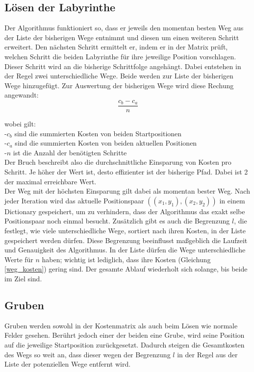 \documentclass[a4paper,10pt,ngerman]{scrartcl}
\begin{document}
\subsection{Lösen der Labyrinthe}
Der Algorithmus funktioniert so, dass er jeweils den momentan besten Weg aus der Liste der bisherigen Wege entnimmt und diesen um einen weiteren Schritt erweitert.
Den nächsten Schritt ermittelt er, indem er in der Matrix prüft, welchen Schritt die beiden Labyrinthe für ihre jeweilige Position vorschlagen.
Dieser Schritt wird an die bisherige Schrittfolge angehängt.
Dabei entstehen in der Regel zwei unterschiedliche Wege. Beide werden zur Liste der bisherigen Wege hinzugefügt.
Zur Auswertung der bisherigen Wege wird diese Rechung angewandt:
\begin{equation}
  \frac{c_b -c_a}{n}
  \label{weg_kosten}
\end{equation}

wobei gilt:\\
-$c_b$ sind die summierten Kosten von beiden Startpositionen\\
-$c_a$ sind die summierten Kosten von beiden aktuellen Positionen\\
-$n$ ist die Anzahl der benötigten Schritte\\
Der Bruch beschreibt also die durchschnittliche Einsparung von Kosten pro Schritt.
Je höher der Wert ist, desto effizienter ist der bisherige Pfad. Dabei ist 2 der maximal erreichbare Wert.
\\
Der Weg mit der höchsten Einsparung gilt dabei als momentan bester Weg.
Nach jeder Iteration wird das aktuelle Positionspaar $((x_1, y_1),(x_2, y_2))$ in einem Dictionary gespeichert,
um zu verhindern, dass der Algorithmus das exakt selbe Positionspaar noch einmal besucht.
Zusätzlich gibt es auch die Begrenzung $l$, die festlegt, wie viele unterschiedliche Wege, sortiert nach ihren Kosten, in der Liste gespeichert werden dürfen.
Diese Begrenzung beeinflusst maßgeblich  die Laufzeit und Genauigkeit des Algorithmus.
In der Liste dürfen die Wege unterschiedliche Werte für $n$ haben; wichtig ist lediglich, dass ihre Kosten (Gleichung \eqref{weg_kosten}) gering sind.
Der gesamte Ablauf wiederholt sich solange, bis beide im Ziel sind.

\subsection{Gruben}
Gruben werden sowohl in der Kostenmatrix als auch beim Lösen wie normale Felder gesehen. 
Berührt jedoch einer der beiden eine Grube, wird seine Position auf die jeweilige Startposition zurückgesetzt.
Dadurch steigen die Gesamtkosten des Wegs so weit an, dass dieser wegen der Begrenzung $l$ in der Regel aus der Liste der potenziellen Wege entfernt wird.
\end{document}
